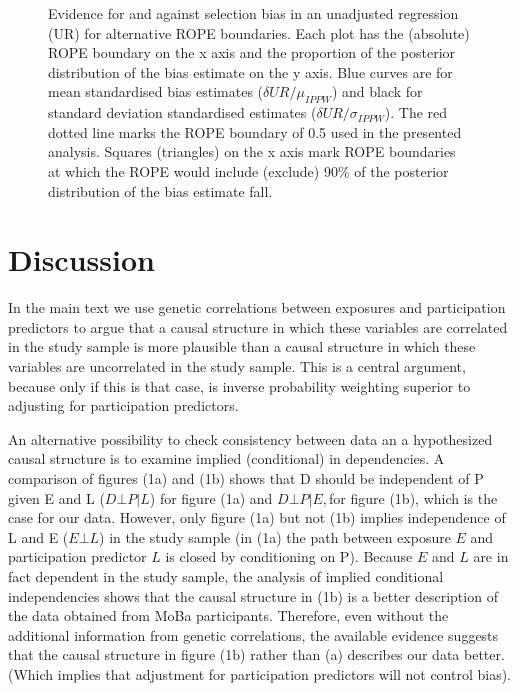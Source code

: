 \documentclass[12pt]{article}
\begin{document}
\begin{figure}[H]
	\centering 
	\caption{Evidence for and against selection bias in an unadjusted regression (UR) for alternative ROPE boundaries. Each plot has the (absolute) ROPE boundary on the x axis and the proportion of the posterior distribution of the bias estimate on the y axis. Blue curves are for mean standardised bias estimates ($\delta{UR}/\mu_{IPPW}$) and black for standard deviation standardised estimates ($\delta{UR}/\sigma_{IPPW}$). The red dotted line marks the ROPE boundary of 0.5 used in the presented analysis. Squares (triangles) on the x axis mark ROPE boundaries at which the ROPE would include (exclude) 90\% of the posterior distribution of the bias estimate fall.}
	\label{fig:ropeplotsUR}
\end{figure}

\section{Discussion}

In the main text we use genetic correlations between exposures and participation predictors to argue that a causal structure in which these variables are correlated in the study sample is more plausible than a causal structure in which these variables are uncorrelated in the study sample. This is a central argument, because only if this is that case, is inverse probability weighting  superior to adjusting for participation predictors.

An alternative possibility to check consistency between data an a hypothesized causal structure is to examine implied (conditional) in dependencies. A comparison of figures (1a) and (1b) shows that D should be independent of P given E and L ($D \bot P | L$) for figure (1a) and $D \bot P | E, $for figure (1b), which is the case for our data. However, only figure (1a) but not (1b) implies independence of L and E ($E \bot L$) in the study sample (in (1a) the path between exposure $E$ and participation predictor $L$ is closed by conditioning on P). Because $E$ and  $L$ are in fact dependent in the study sample, the analysis of implied conditional independencies shows that the causal structure in (1b) is a better description of the data obtained from MoBa participants. Therefore, even without the additional information from genetic correlations, the available evidence suggests that the causal structure in figure (1b) rather than (a) describes our data better. (Which implies that adjustment for participation predictors will not control bias).
\end{document}
